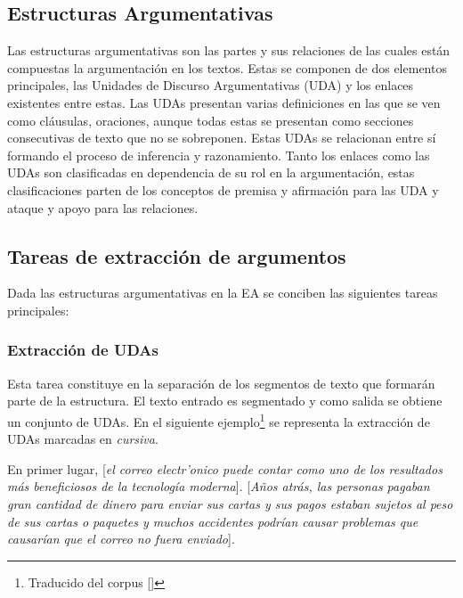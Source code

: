 \subsection{Estructuras Argumentativas}


Las estructuras argumentativas son las partes y sus relaciones de las cuales están compuestas la argumentación en los textos.
Estas se componen de dos elementos principales, las Unidades de Discurso Argumentativas (UDA) y los enlaces
existentes entre estas.
Las UDAs presentan varias definiciones en las que se ven como cláusulas, oraciones, aunque
todas estas se presentan como secciones consecutivas de texto que no se sobreponen. Estas UDAs se relacionan entre 
sí formando el proceso de inferencia y razonamiento.
Tanto los enlaces como las UDAs son clasificadas en dependencia de su rol en la argumentación, estas clasificaciones 
parten de los conceptos de premisa y afirmación para las UDA y ataque y apoyo para las relaciones. 

\subsection{Tareas de extracción de argumentos}

Dada las estructuras argumentativas en la EA se conciben las siguientes tareas principales:

\subsubsection{Extracción de UDAs}

Esta tarea constituye en la separación de los segmentos de texto que formarán parte de la estructura.
El texto entrado es segmentado y como salida se obtiene un conjunto de UDAs. En el siguiente 
ejemplo\footnote{Traducido del corpus [\cite{stab2017parsing}]} se representa 
la extracción de UDAs marcadas en \emph{cursiva}.

\begin{adjustwidth}{25pt}{25pt}
    En primer lugar, [\emph{el correo electr'onico puede contar como uno de los resultados
    más beneficiosos de la tecnología moderna}]. [\emph{Años atrás, las personas pagaban gran cantidad de dinero para 
    enviar sus cartas y sus pagos estaban sujetos al peso de sus cartas o paquetes y muchos accidentes podrían 
    causar problemas que causarían que el correo no fuera enviado}].
\end{adjustwidth}

